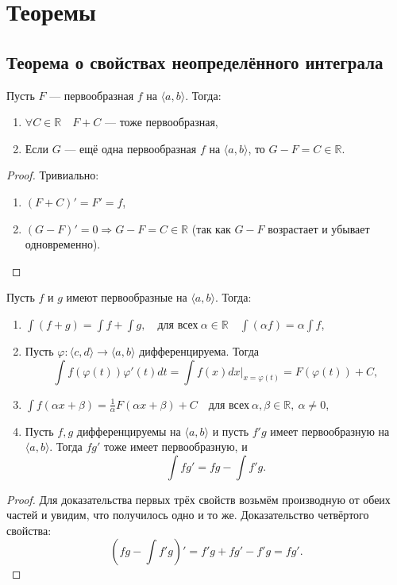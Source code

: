\section{Теоремы}

\subsection{Теорема о свойствах неопределённого интеграла}

\begin{ntheorem} \hypertarget{t1_1}{}
	Пусть $F$ --- первообразная $f$ на $\langle a, b \rangle$. Тогда:
	\begin{enumerate}
		\item $\forall C \in \mathbb{R} \quad F + C$ --- тоже первообразная,
		\item Если $G$ --- ещё одна первообразная $f$ на $\langle a, b \rangle$, то $G - F = C \in \mathbb{R}$.
	\end{enumerate}
\end{ntheorem}
\begin{proof}
	Тривиально:
	\begin{enumerate}
		\item $(F + C)' = F' = f$,
		\item $(G - F)' = 0 \Rightarrow G - F = C \in \mathbb{R}$ (так как $G - F$ возрастает и убывает одновременно).
	\end{enumerate}
\end{proof}

\begin{ntheorem} \hypertarget{t1_2}{}
	Пусть $f$ и $g$ имеют первообразные на $\langle a, b \rangle$. Тогда:
	\begin{enumerate}
		\item \(\displaystyle \int (f + g) = \int f + \int g, \quad \text{для всех} \ \alpha \in \mathbb{R} \quad \int (\alpha f) = \alpha \int f\),
		\item Пусть $\varphi \colon \langle c, d \rangle \to \langle a, b \rangle$ дифференцируема. Тогда \[
			\int f(\varphi(t)) \varphi'(t) dt = \int f(x) dx \bigg|_{x = \varphi(t)} = F(\varphi(t)) + C,
		\]
		\item \(\displaystyle \int f(\alpha x + \beta) = \frac1\alpha F(\alpha x + \beta) + C \quad \text{для всех} \ \alpha, \beta \in \mathbb{R}, \ \alpha \neq 0\),
		\item Пусть $f, g$ дифференцируемы на $\langle a, b \rangle$ и пусть $f'g$ имеет первообразную на $\langle a, b \rangle$.
		Тогда $fg'$ тоже имеет первообразную, и \[
			\int fg' = fg - \int f'g.
		\]
	\end{enumerate}
\end{ntheorem}
\begin{proof}
		Для доказательства первых трёх свойств возьмём производную от обеих частей и увидим, что получилось одно и то же.
		Доказательство четвёртого свойства: \[
		\left( fg - \int f'g \right)' = f'g + fg' - f'g = fg'.
		\]
\end{proof}

